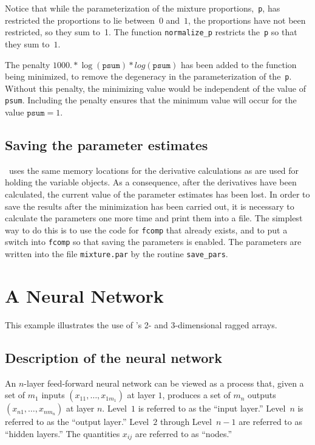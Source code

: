 \documentclass{admbmanual}
\begin{document}
Notice that while the parameterization of the mixture proportions,~\texttt{p},
has restricted the proportions to lie between~$0$ and~$1$, the
proportions have not been restricted, so they sum to~1. 
The function \texttt{normalize\_p} restricts the~\texttt{p} so that they sum 
to~$1$. 

The penalty $1000.*\log(\texttt{psum})*log(\texttt{psum})$ has been added to the
function being minimized, to remove the degeneracy in the parameterization of
the~\texttt{p}. Without this penalty, the minimizing value 
would be independent of the value of \texttt{psum}. Including
the penalty ensures that the minimum value will occur for the value
$\texttt{psum}=1$.


\section{Saving the parameter estimates}

\scAD\ uses the same memory locations for the derivative
calculations as are used for holding the variable objects.
As a consequence, after the derivatives have been calculated,
the current value of the parameter estimates has been lost.
In order to save the results after the minimization has
been carried out, it is necessary to calculate the
parameters one more time and print them into a file.
The simplest way to do this is to use the code for
\texttt{fcomp} that already exists, and to put a
switch into \texttt{fcomp} so that saving the parameters is enabled.
The parameters are written into the file \texttt{mixture.par} by the
routine \texttt{save\_pars}.
 




\chapter{A Neural Network}\label{ch:neural-networks}


This example illustrates the use of \scAD\thinspace's 2- and 3-dimensional
ragged arrays.


\section{Description of the neural network}
\label{sec:description-nn}

An $n$-layer feed-forward neural network can be viewed as a process that, 
given a set of $m_1$ inputs $(x_{11},\ldots,x_{1m_1})$ at layer $1$, 
produces a set
of $m_n$ outputs $(x_{n1},\ldots,x_{nm_n})$  at layer $n$.
Level~$1$ is referred to as the ``input layer.'' Level~$n$ is
referred to as the ``output layer.'' Level~$2$ through Level~$n-1$ are
referred to as ``hidden layers.'' The quantities $x_{ij}$ are referred to
as ``nodes.''
  
\end{document}
